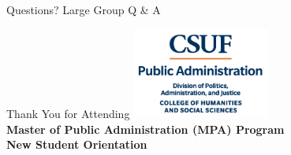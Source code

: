 \documentclass[10pt]{beamer}
\begin{document}
\begin{frame}[standout]{Questions?}
\huge{Large Group Q \& A}
\end{frame}

\begin{frame}{Thank You for Attending}
\centering
\includegraphics[height=3cm]{images/PUBLIC-ADMINISTRATION-color.png}\\[10pt]
\textbf{Master of Public Administration (MPA) Program}\\
\textbf{New Student Orientation}
\end{frame}
\end{document}
